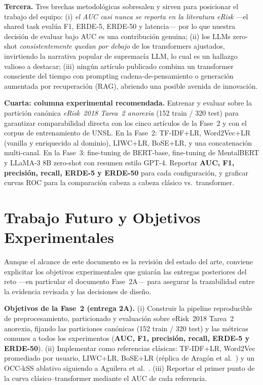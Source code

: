 \documentclass[journal]{IEEEtran}
\begin{document}
\textbf{Tercera.} Tres brechas metodológicas sobresalen y sirven para posicionar el trabajo del equipo: (i) \emph{el AUC casi nunca se reporta en la literatura eRisk} ---el shared task evalúa F1, ERDE-5, ERDE-50 y latencia--- por lo que nuestra decisión de evaluar bajo AUC es una contribución genuina; (ii) los LLMs zero-shot \emph{consistentemente quedan por debajo} de los transformers ajustados, invirtiendo la narrativa popular de supremacía LLM, lo cual es un hallazgo valioso a destacar; (iii) ningún artículo publicado combina un transformer consciente del tiempo con prompting cadena-de-pensamiento o generación aumentada por recuperación (RAG), abriendo una posible avenida de innovación.

\textbf{Cuarta: columna experimental recomendada.} Entrenar y evaluar sobre la partición canónica \emph{eRisk~2018 Tarea~2 anorexia} (152 train / 320 test) para garantizar comparabilidad directa con los cinco artículos de la Fase~2 y con el corpus de entrenamiento de UNSL. En la Fase~2: TF-IDF+LR, Word2Vec+LR (vanilla y enriquecido al dominio), LIWC+LR, BoSE+LR, y una concatenación multi-canal. En la Fase~3: fine-tuning de BERT-base, fine-tuning de MentalBERT y LLaMA-3 8B zero-shot con resumen estilo GPT-4. Reportar \textbf{AUC, F1, precisión, recall, ERDE-5 y ERDE-50} para cada configuración, y graficar curvas ROC para la comparación cabeza a cabeza clásico vs.~transformer.

\section{Trabajo Futuro y Objetivos Experimentales}

Aunque el alcance de este documento es la revisión del estado del arte, conviene explicitar los objetivos experimentales que guiarán las entregas posteriores del reto ---en particular el documento Fase~2A--- para asegurar la trazabilidad entre la evidencia revisada y las decisiones de diseño.

\textbf{Objetivos de la Fase~2 (entrega 2A).} (i) Construir la pipeline reproducible de preprocesamiento, particionado y evaluación sobre eRisk~2018 Tarea~2 anorexia, fijando las particiones canónicas (152 train / 320 test) y las métricas comunes a todos los experimentos (\textbf{AUC, F1, precisión, recall, ERDE-5 y ERDE-50}). (ii) Implementar como referencias clásicas: TF-IDF+LR, Word2Vec promediado por usuario, LIWC+LR, BoSE+LR (réplica de Aragón et al.~\cite{aragon2023bose}) y un OCC-kSS ablativo siguiendo a Aguilera et al.~\cite{aguilera2021oneclass}. (iii) Reportar el primer punto de la curva clásico--transformer mediante el AUC de cada referencia.
\end{document}
